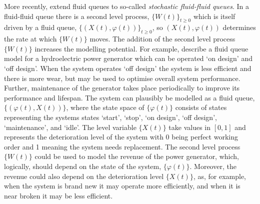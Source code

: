 More recently, \cite{bo2014} extend fluid queues to so-called \emph{stochastic fluid-fluid queues}. In a fluid-fluid queue there is a second level process, \(\{W(t)\}_{t\geq0}\) which is itself driven by a fluid queue, \(\{(X(t),\varphi(t))\}_{t\geq0}\), so \((X(t),\varphi(t))\) determines the rate at which \(\{W(t)\}\) moves. The addition of the second level process \(\{W(t)\}\) increases the modelling potential. For example, \cite{hydro} describe a fluid queue model for a hydroelectric power generator which can be operated `on design' and `off design'. When the system operates `off design' the system is less efficient and there is more wear, but may be used to optimise overall system performance. Further, maintenance of the generator takes place periodically to improve its performance and lifespan. The system can plausibly be modelled as a fluid queue, \(\{(\varphi(t),X(t))\}\), where the state space of \(\{\varphi(t)\}\) consists of states representing the systems states `start', `stop', `on design', `off design', `maintenance', and `idle'. The level variable \(\{X(t)\}\) take values in \([0,1]\) and represents the deterioration level of the system with 0 being perfect working order and 1 meaning the system needs replacement. The second level process \(\{W(t)\}\) could be used to model the revenue of the power generator, which, logically, should depend on the state of the system, \(\{\varphi(t)\}\). Moreover, the revenue could also depend on the deterioration level \(\{X(t)\}\), as, for example, when the system is brand new it may operate more efficiently, and when it is near broken it may be less efficient. 


